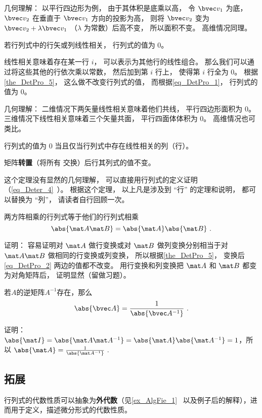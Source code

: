 几何理解： 以平行四边形为例， 由于其体积是底乘以高， 令 $\bvec v_1$ 为底， $\bvec v_2$ 在垂直于 $\bvec v_1$ 方向的投影为高， 则将 $\bvec v_2$ 变为 $\bvec v_2 + \lambda \bvec v_1$ （$\lambda$ 为常数）后高不变， 所以面积不变。 高维情况同理。

\begin{theorem}{ }\label{the_DetPro_9}
若行列式中的行矢或列线性相关， 行列式的值为 0。
\end{theorem}
线性相关意味着存在某一行 $i$， 可以表示为其他行的线性组合。 那么我们可以通过将这些其他的行依次乘以常数， 然后加到第 $i$ 行上， 使得第 $i$ 行全为 0。 根据\autoref{the_DetPro_5}， 这么做不改变行列式的值， 而根据\autoref{eq_DetPro_1}， 行列式的值为 0。

几何理解： 二维情况下两矢量线性相关意味着他们共线， 平行四边形面积为 0。 三维情况下线性相关意味着三个矢量共面， 平行四面体体积为 0。 高维情况也可类比。

\begin{theorem}{ } \label{the_DetPro_2}
行列式的值为 0 当且仅当行列式中存在线性相关的列（行）。
\end{theorem}

\begin{theorem}{ }\label{the_DetPro_7}
矩阵\textbf{转置}（将所有  交换）后行其列式的值不变。
\end{theorem}
这个定理没有显然的几何理解， 可以直接用行列式的定义证明（\autoref{eq_Deter_4}~）。 根据这个定理， 以上凡是涉及到 “行” 的定理和说明， 都可以替换为 “列”， 请读者自行回顾一次。

\begin{theorem}{}\label{the_DetPro_8}
两方阵相乘的行列式等于他们的行列式相乘
\begin{equation}\label{eq_DetPro_2}
\abs{\mat A \mat B} = \abs{\mat A}\abs{\mat B}~.
\end{equation}
\end{theorem}
证明： 容易证明对 $\mat A$ 做行变换或对 $\mat B$ 做列变换分别相当于对 $\mat A\mat B$ 做相同的行变换或列变换， 所以根据\autoref{the_DetPro_5}， 变换后\autoref{eq_DetPro_2} 两边的值都不改变。 用行变换和列变换把 $\mat A$ 和 $\mat B$ 都变为对角矩阵后， 证明显然（留做习题）。

\begin{theorem}{}
若$A$的逆矩阵$A^{-1}$存在，那么
\begin{equation}
\abs{\bvec A}=\frac{1}{\abs{\bvec A^{-1}}}~.
\end{equation}
\end{theorem}
证明：
$\abs{\mat I} = \abs{\mat A \mat A^{-1}} = \abs{\mat A}\abs{\mat A^{-1}}=1$，所以
$\abs{\mat A}=\frac{1}{\abs{\mat A^{-1}}}~.$

\subsection{拓展}

行列式的代数性质可以抽象为\textbf{外代数}（见\autoref{ex_AlgFie_1}~ 以及例子后的解释），进而用于定义，描述微分形式的代数性质。

